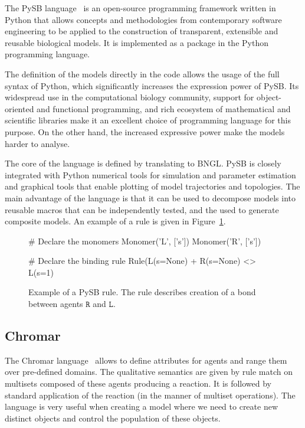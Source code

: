 \documentclass[11pt,a4paper]{report}
\begin{document}
The PySB language~\cite{lopez2013programming} is an open-source programming framework written in Python that allows concepts and methodologies from contemporary software engineering to be applied to the construction of transparent, extensible and reusable biological models. It is implemented as a package in the Python programming language. 

The definition of the models directly in the code allows the usage of the full syntax of Python, which significantly increases the expression power of PySB. Its widespread use in the computational biology community, support for object-oriented and functional programming, and rich ecosystem of mathematical and scientific libraries make it an excellent choice of programming language for this purpose. On the other hand, the increased expressive power make the models harder to analyse.

The core of the language is defined by translating to BNGL. PySB is closely integrated with Python numerical tools for simulation and parameter estimation and graphical tools that enable plotting of model trajectories and topologies. The main advantage of the language is that it can be used to decompose models into reusable macros that can be independently tested, and the used to generate composite models. An example of a rule is given in Figure~\ref{pysb_rule}.

\begin{figure}[!h]
\begin{center}
\begin{python}
# Declare the monomers
Monomer('L', ['s'])
Monomer('R', ['s'])

# Declare the binding rule
Rule(L(s=None) + R(s=None) <> L(s=1) %
\end{python}
\end{center}
\caption{Example of a PySB rule. The rule describes creation of a bond between agents $\mathtt{R}$ and $\mathtt{L}$.}\label{PySB-rule}\label{pysb_rule}
\end{figure}

\subsection{Chromar}

The Chromar language~\cite{honorato2018chromar} allows to define attributes for agents and range them over pre-defined domains. The qualitative semantics are given by rule match on multisets composed of these agents producing a reaction. It is followed by standard application of the reaction (in the manner of multiset operations). The language is very useful when creating a model where we need to create new distinct objects and control the population of these objects.
\end{document}
